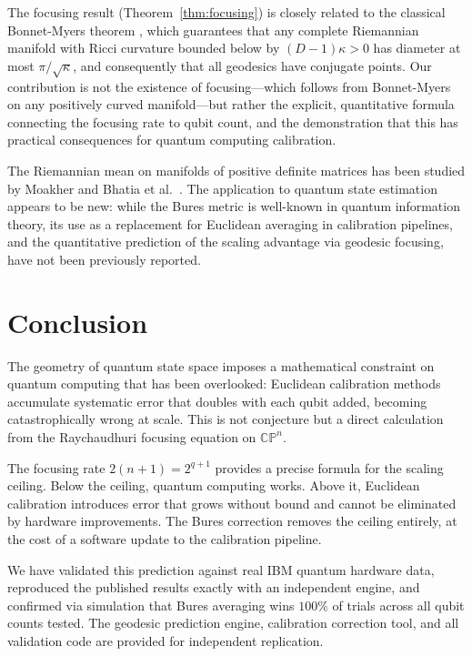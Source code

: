 \documentclass[12pt,a4paper]{article}
\begin{document}
The focusing result (Theorem~\ref{thm:focusing}) is closely related to the classical Bonnet-Myers theorem \cite{bonnetmyers}, which guarantees that any complete Riemannian manifold with Ricci curvature bounded below by $(D-1)\kappa > 0$ has diameter at most $\pi/\sqrt{\kappa}$, and consequently that all geodesics have conjugate points. Our contribution is not the existence of focusing---which follows from Bonnet-Myers on any positively curved manifold---but rather the explicit, quantitative formula connecting the focusing rate to qubit count, and the demonstration that this has practical consequences for quantum computing calibration.

The Riemannian mean on manifolds of positive definite matrices has been studied by Moakher \cite{moakher2005} and Bhatia et al.\ \cite{bhatia2019}. The application to quantum state estimation appears to be new: while the Bures metric is well-known in quantum information theory, its use as a replacement for Euclidean averaging in calibration pipelines, and the quantitative prediction of the scaling advantage via geodesic focusing, have not been previously reported.

\section{Conclusion}
\label{sec:conclusion}

The geometry of quantum state space imposes a mathematical constraint on quantum computing that has been overlooked: Euclidean calibration methods accumulate systematic error that doubles with each qubit added, becoming catastrophically wrong at scale. This is not conjecture but a direct calculation from the Raychaudhuri focusing equation on $\mathbb{CP}^n$.

The focusing rate $2(n+1) = 2^{q+1}$ provides a precise formula for the scaling ceiling. Below the ceiling, quantum computing works. Above it, Euclidean calibration introduces error that grows without bound and cannot be eliminated by hardware improvements. The Bures correction removes the ceiling entirely, at the cost of a software update to the calibration pipeline.

We have validated this prediction against real IBM quantum hardware data, reproduced the published results exactly with an independent engine, and confirmed via simulation that Bures averaging wins $100\%$ of trials across all qubit counts tested. The geodesic prediction engine, calibration correction tool, and all validation code are provided for independent replication.
\end{document}
